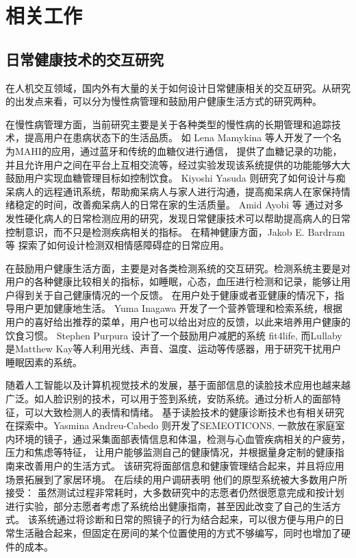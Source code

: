 \chapter{相关工作}

\section{日常健康技术的交互研究}

在人机交互领域，国内外有大量的关于如何设计日常健康相关的交互研究。从研究的出发点来看，可以分为慢性病管理和鼓励用户健康生活方式的研究两种。

在慢性病管理方面，当前研究主要是关于各种类型的慢性病的长期管理和追踪技术，提高用户在患病状态下的生活品质。
如 Lena Mamykina \cite{mamykina2008mahi:}等人开发了一个名为MAHI的应用，通过蓝牙和传统的血糖仪进行通信，
提供了血糖记录的功能，并且允许用户之间在平台上互相交流等，经过实验发现该系统提供的功能能够大大鼓励用户实现血糖管理目标如控制饮食。
Kiyoshi Yasuda \cite{yasuda2009remote}则研究了如何设计与痴呆病人的远程通讯系统，帮助痴呆病人与家人进行沟通，提高痴呆病人在家保持情绪稳定的时间，改善痴呆病人的日常在家的生活质量。
Amid Ayobi 等\cite{ayobi2017quantifying} 通过对多发性硬化病人的日常检测应用的研究，发现日常健康技术可以帮助提高病人的日常控制意识，而不只是检测疾病相关的指标。
在精神健康方面，Jakob E. Bardram等 \cite{bardram2013designing}探索了如何设计检测双相情感障碍症的日常应用。

在鼓励用户健康生活方面，主要是对各类检测系统的交互研究。检测系统主要是对用户的各种健康比较相关的指标，如睡眠，心态，血压进行检测和记录，能够让用户得到关于自己健康情况的一个反馈。
在用户处于健康或者亚健康的情况下，指导用户更加健康地生活。 
Yuma Inagawa  \cite{Inagawa2013A} 开发了一个营养管理和检索系统，根据用户的喜好给出推荐的菜单，用户也可以给出对应的反馈，以此来培养用户健康的饮食习惯。
Stephen Purpura \cite{purpura2011fit4life} 设计了一个鼓励用户减肥的系统 fit4life,  而Lullaby  \cite{kay2012lullaby} 是Matthew Kay等人利用光线、声音、温度、运动等传感器，用于研究干扰用户睡眠因素的系统。

随着人工智能以及计算机视觉技术的发展，基于面部信息的读脸技术应用也越来越广泛。如人脸识别的技术，可以用于签到系统，安防系统。通过分析人的面部特征，可以大致检测人的表情和情绪。
基于读脸技术的健康诊断技术也有相关研究在探索中。Yasmina Andreu-Cabedo  \cite{andreu2015mirror}则开发了SEMEOTICONS, 一款放在家庭室内环境的镜子，通过采集面部表情信息和体温，检测与心血管疾病相关的户疲劳，压力和焦虑等特征， 让用户能够监测自己的健康情况，并根据量身定制的健康指南来改善用户的生活方式。
 该研究将面部信息和健康管理结合起来，并且将应用场景拓展到了家居环境。
 在后续的用户调研表明\cite{coppini2017user} 他们的原型系统被大多数用户所接受： 虽然测试过程非常耗时，大多数研究中的志愿者仍然很愿意完成和按计划进行实验，部分志愿者考虑了系统给出健康指南，甚至因此改变了自己的生活方式。
该系统通过将诊断和日常的照镜子的行为结合起来，可以很方便与用户的日常生活融合起来，但固定在房间的某个位置使用的方式不够编写，同时也增加了硬件的成本。

